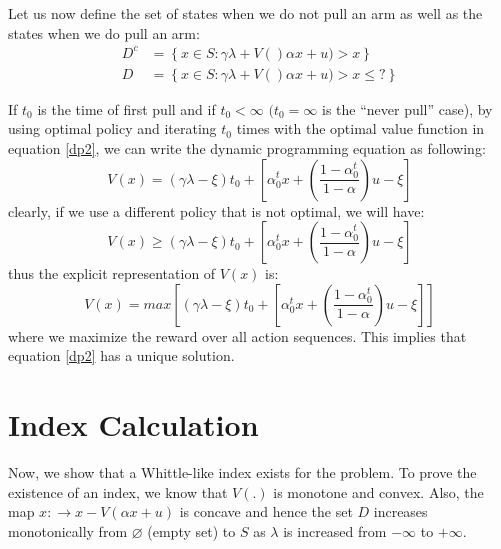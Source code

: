 \documentclass[conference]{IEEEtran}
\begin{document}
Let us now define the set of states when we do not pull an arm as well as the states when we do pull an arm:
\begin{align}
  D^{c} & = \left \{x\in S: \gamma \lambda + V()\alpha x + u) > x \right \} \\
  D & = \left \{x \in S: \gamma \lambda + V()\alpha x + u) > x \leq ? \right\}
\end{align}

If $t_0$ is the time of first pull and if $t_0<\infty$ $(t_0=\infty$ is the ``never pull'' case), by using optimal policy and iterating $t_0$ times with the optimal value function in equation \ref{dp2}, we can write the dynamic programming equation as following:
\begin{equation}
    V(x) = (\gamma \lambda - \xi)t_0 + \left [\alpha^t_0 x + (\frac{1-\alpha^t_0}{1-\alpha})u - \xi \right ]
\end{equation}
clearly, if we use a different policy that is not optimal, we will have:
\begin{equation}
    V(x) \geq (\gamma \lambda - \xi)t_0 + \left [\alpha^t_0 x + (\frac{1-\alpha^t_0}{1-\alpha})u - \xi \right ]    
\end{equation}
thus the explicit representation of $V(x)$ is:
\begin{equation}
    V(x) = max \left [(\gamma \lambda - \xi)t_0 + \left [\alpha^t_0 x + (\frac{1-\alpha^t_0}{1-\alpha})u - \xi \right ]\right ]
\end{equation}
where we maximize the reward over all action sequences. This implies that equation \ref{dp2} has a unique solution.

\section{Index Calculation}
Now, we show that a Whittle-like index exists for the problem. To prove the existence of an index, we know that $V(.)$ is monotone and convex. Also, the map $x :\rightarrow x-V(\alpha x + u)$ is concave and hence the set $D$ increases monotonically from $\varnothing$ (empty set) to $S$ as $\lambda$ is increased from $-\infty$ to $+\infty$.
\end{document}
